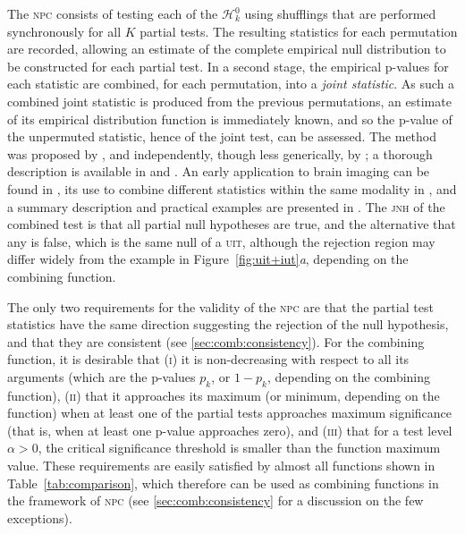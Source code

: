 The \textsc{npc} consists of testing each of the $\mathcal{H}^0_k$ using shufflings that are performed synchronously for all $K$ partial tests. The resulting statistics for each permutation are recorded, allowing an estimate of the complete empirical null distribution to be constructed for each partial test. In a second stage, the empirical p-values for each statistic are combined, for each permutation, into a \emph{joint statistic}. As such a combined joint statistic is produced from the previous permutations, an estimate of its empirical distribution function is immediately known, and so the p-value of the unpermuted statistic, hence of the joint test, can be assessed. The method was proposed by \citet{Pesarin1990, Pesarin1992}, and independently, though less generically, by \citet{Blair1994}; a thorough description is available in \citet{Pesarin2001} and \citet{Pesarin2010}. An early application to brain imaging can be found in \citet{Hayasaka2006}, its use to combine different statistics within the same modality in \citet{hayasaka2004_combining}, and a summary description and practical examples are presented in \citet{Brombin2013}. The \textsc{jnh} of the combined test is that all partial null hypotheses are true, and the alternative that any is false, which is the same null of a \textsc{uit}, although the rejection region may differ widely from the example in Figure~\ref{fig:uit+iut}\emph{a}, depending on the combining function.

The only two requirements for the validity of the \textsc{npc} are that the partial test statistics have the same direction suggesting the rejection of the null hypothesis, and that they are consistent (see \ref{sec:comb:consistency}). For the combining function, it is desirable that (\textsc{i}) it is non-decreasing with respect to all its arguments (which are the p-values $p_k$, or $1-p_k$, depending on the combining function), (\textsc{ii}) that it approaches its maximum (or minimum, depending on the function) when at least one of the partial tests approaches maximum significance (that is, when at least one p-value approaches zero), and (\textsc{iii}) that for a test level $\alpha > 0$, the critical significance threshold is smaller than the function maximum value. These requirements are easily satisfied by almost all functions shown in Table~\ref{tab:comparison}, which therefore can be used as combining functions in the framework of \textsc{npc} (see \ref{sec:comb:consistency} for a discussion on the few exceptions).


